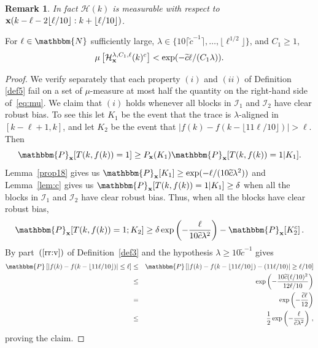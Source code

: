 \documentclass[final,12pt]{colt2018} %
\newtheorem*{unremark}{Remark}
\newcommand{\N}{\mathbbm{N}}
\renewcommand{\P}{\mathbbm{P}}
\newcommand{\1}{\mathbf{1}}
\def\cI{\mathcal{I}}
\newcommand{\eqb}{\begin{equation}}
\newcommand{\eqe}{\end{equation}}
\newcommand{\wt}{\widetilde}
\def\x{{\bf x}}
\def\ct{{\wt c}}
\def\Rc{{\mathcal H}}
\begin{document}
\begin{unremark}
	In fact $\Rc (k)$ is measurable with respect to  $\x( k-\ell-2\lfloor
	\ell/10 \rfloor : k + \lfloor \ell / 10 \rfloor )$.
\end{unremark}

\begin{lemma}
	For  $\ell\in\N$ sufficiently large, $\lambda \in \{ 10 \lceil
	\ct^{-1} \rceil,\dots,\lfloor \ell^{1/2}\rfloor \}$,
	and $C_1\geq 1$,
	\eqb \label{eq:mu}
	\mu\left[\Rc_\x^{\lambda,C_1,\ell}(k)^c\right]
	<\exp(-\ct \ell/(C_1\lambda)).
	\eqe
	\label{prop19}
\end{lemma}

\begin{proof}
	We verify separately that each property $(i)$ and $(ii)$ of
	Definition \ref{def5} fail on a set of $\mu$-measure at most
	half the quantity on the right-hand side of~\eqref{eq:mu}.
	We claim that $(i)$ holds whenever all blocks in
	$\cI_1$ and $\cI_2$ have clear robust bias.  To see this
	let $K_1$ be the event that the trace is $\lambda$-aligned in
	$[k - \ell + 1 , k]$, and let $K_2$ be the event that
	$|f(k) - f(k - \lfloor 11 \ell / 10 \rfloor)| > \ell$.
	Then
	$$\P_\x [T(k,f(k)) = 1] \geq P_\x (K_1) \P_\x [T(k,f(k)) = 1 | K_1].$$
	Lemma~\ref{prop18} gives us $\P_\x [K_1] \geq \exp ( - \ell /
	(10 \ct \lambda^2))$ and Lemma~\ref{lem:c} gives us
	$\P_\x [T(k,f(k)) = 1 | K_1] \geq \delta$ when all the blocks in $\cI_1$
	and $\cI_2$ have clear robust bias.  Thus, when all the blocks have
	clear robust bias,
	$$\P_\x [T(k , f(k)) = 1 ; K_2] \geq \delta \exp \left (
	-\frac{\ell}{10 \ct \lambda^2} \right ) - \P_\x [K_2^c] \, .$$
	By part~$(\ref{rr:v})$ of
	Definition~\ref{def3} and the hypothesis $\lambda \geq 10 \ct^{-1}$
	gives
	\begin{eqnarray*}
		\P \left[|f(k) - f(k-\lfloor 11\ell/10\rfloor)| \leq \ell \right]
		& \leq & \P \left[|f(k) - f(k-\lfloor 11\ell/10\rfloor) - (11 \ell / 10) |
		\geq \ell / 10 \right] \\
		& \leq & \exp \left ( -\frac{10 \ct (\ell / 10)^2}{12 \ell / 10} \right ) \\
		& = & \exp \left ( - \frac{\ct \ell}{12} \right ) \\
		& \leq & \frac{1}{2} \exp \left ( - \frac{\ell}{\ct \lambda^2} \right ) \, ,
	\end{eqnarray*}
	proving the claim.
	

\end{proof}
\end{document}

